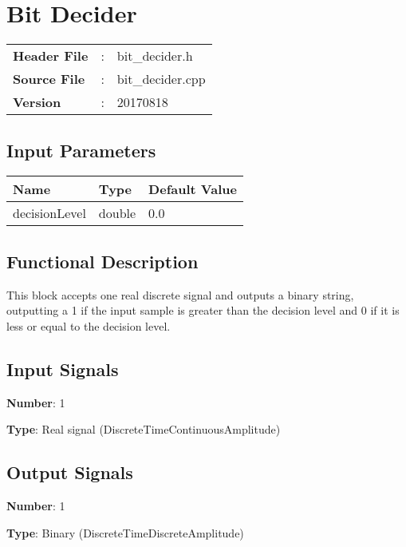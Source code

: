 \clearpage

\section{Bit Decider}

\begin{tcolorbox}	
\begin{tabular}{p{2.75cm} p{0.2cm} p{10.5cm}} 	
\textbf{Header File}   &:& bit\_decider.h \\
\textbf{Source File}   &:& bit\_decider.cpp \\
\textbf{Version}       &:& 20170818
\end{tabular}
\end{tcolorbox}

\subsection*{Input Parameters}

\begin{table}[H]
\centering
\begin{tabular}{|l|l|l|}
\hline
Name           & Type   & Default Value     \\ \hline
decisionLevel  & double &  0.0              \\ \hline
\end{tabular}
\end{table}

\subsection*{Functional Description}

This block accepts one real discrete signal and outputs a binary string, outputting a 1 if the input sample is greater than the decision level and 0 if it is less or equal to the decision level.

\subsection*{Input Signals}

\textbf{Number}: 1

\textbf{Type}: Real signal (DiscreteTimeContinuousAmplitude)

\subsection*{Output Signals}

\textbf{Number}: 1

\textbf{Type}: Binary (DiscreteTimeDiscreteAmplitude)
